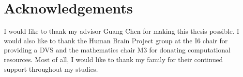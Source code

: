 \chapter{Acknowledgements}

I would like to thank my advisor Guang Chen for making this thesis possible. I
would also like to thank the Human Brain Project group at the I6 chair for
providing a DVS and the mathematics chair M3 for donating computational
resources. Most of all, I would like to thank my family for their continued
support throughout my studies.
